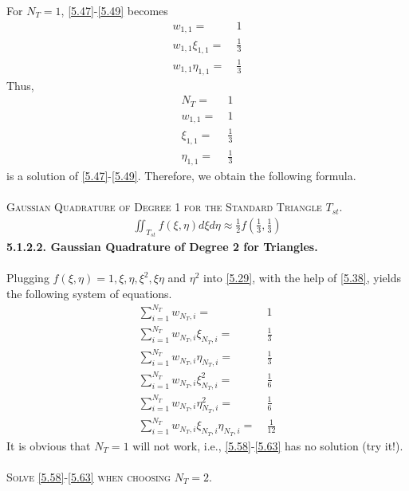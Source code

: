 \documentclass[a4paper]{article}
\numberwithin{equation}{section}
\begin{document}
For $N_T=1$, \eqref{5.47}-\eqref{5.49} becomes
\begin{align}
{w_{1,1}} =&\ 1\\
{w_{1,1}}{\xi _{1,1}} =&\ \frac{1}{3}\\
{w_{1,1}}{\eta _{1,1}} =&\ \frac{1}{3}
\end{align}
Thus, 
\begin{align}
{N_T} =&\ 1\\
{w_{1,1}} =&\ 1\\
{\xi _{1,1}} =&\ \frac{1}{3}\\
{\eta _{1,1}} =&\ \frac{1}{3}
\end{align}
is a solution of \eqref{5.47}-\eqref{5.49}. Therefore, we obtain the following formula.\\
\\
\textsc{Gaussian Quadrature of Degree 1 for the Standard Triangle $T_{st}$.}
\begin{align}
\iint_{{T_{st}}} {f\left( {\xi ,\eta } \right)d\xi d\eta } \approx \frac{1}{2}f\left( {\frac{1}{3},\frac{1}{3}} \right)
\end{align}
\textbf{5.1.2.2. Gaussian Quadrature of Degree 2 for Triangles.}\\
\\
Plugging $f\left( {\xi ,\eta } \right) = 1,\xi ,\eta ,{\xi ^2},\xi \eta$ and ${\eta ^2}$ into \eqref{5.29}, with the help of \eqref{5.38}, yields the following system of equations.
\begin{align}
\label{5.58}
\sum\limits_{i = 1}^{{N_T}} {{w_{{N_T},i}}}  =&\ 1\\
\sum\limits_{i = 1}^{{N_T}} {{w_{{N_T},i}}{\xi _{{N_T},i}}}  =&\ \frac{1}{3}\\
\sum\limits_{i = 1}^{{N_T}} {{w_{{N_T},i}}{\eta _{{N_T},i}}}  =&\ \frac{1}{3}\\
\sum\limits_{i = 1}^{{N_T}} {{w_{{N_T},i}}\xi _{{N_T},i}^2}  =&\ \frac{1}{6}\\
\sum\limits_{i = 1}^{{N_T}} {{w_{{N_T},i}}\eta _{{N_T},i}^2}  =&\ \frac{1}{6}\\
\sum\limits_{i = 1}^{{N_T}} {{w_{{N_T},i}}{\xi _{{N_T},i}}{\eta _{{N_T},i}}}  =&\ \frac{1}{{12}} \label{5.63}
\end{align}
It is obvious that $N_T=1$ will not work, i.e., \eqref{5.58}-\eqref{5.63} has no solution (try it!).\\
\\
\textsc{Solve \eqref{5.58}-\eqref{5.63} when choosing $N_T=2$.}
\end{document}
